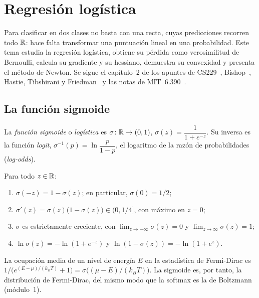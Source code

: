 \chapter{Regresión logística}
\label{tema:3}

Para clasificar en dos clases no basta con una recta, cuyas predicciones recorren todo $\mathbb{R}$: hace falta transformar una puntuación lineal en una probabilidad. Este tema estudia la regresión logística, obtiene su pérdida como verosimilitud de Bernoulli, calcula su gradiente y su hessiano, demuestra su convexidad y presenta el método de Newton. Se sigue el capítulo~2 de los apuntes de CS229~\cite[§2.1 y §2.4]{cs229}, Bishop~\cite[§4.3.2--4.3.3]{bishop}, Hastie, Tibshirani y Friedman~\cite[§4.4.1]{esl} y las notas de MIT~6.390~\cite[§4.3--4.4]{mit6390}.

\section{La función sigmoide}

\begin{definicion}\label{def:sigmoide}
La \emph{función sigmoide} o \emph{logística} es $\sigma\colon\mathbb{R}\to(0,1)$, $\sigma(z)=\dfrac{1}{1+e^{-z}}$. Su inversa es la función \emph{logit}, $\sigma^{-1}(p)=\ln\dfrac{p}{1-p}$, el logaritmo de la razón de probabilidades (\emph{log-odds}).
\end{definicion}

\begin{proposicion}\label{prop:sigmoide}
Para todo $z\in\mathbb{R}$:
\begin{enumerate}
  \item $\sigma(-z)=1-\sigma(z)$; en particular, $\sigma(0)=1/2$;
  \item $\sigma'(z)=\sigma(z)\bigl(1-\sigma(z)\bigr)\in(0,1/4]$, con máximo en $z=0$;
  \item $\sigma$ es estrictamente creciente, con $\lim_{z\to-\infty}\sigma(z)=0$ y $\lim_{z\to\infty}\sigma(z)=1$;
  \item $\ln\sigma(z)=-\ln(1+e^{-z})$ y $\ln(1-\sigma(z))=-\ln(1+e^{z})$.
\end{enumerate}
\end{proposicion}

\begin{observacion}[Física]
La ocupación media de un nivel de energía $E$ en la estadística de Fermi-Dirac es $1/\bigl(e^{(E-\mu)/(k_BT)}+1\bigr)=\sigma\bigl((\mu-E)/(k_BT)\bigr)$. La sigmoide es, por tanto, la distribución de Fermi-Dirac, del mismo modo que la softmax es la de Boltzmann (módulo~1).
\end{observacion}

